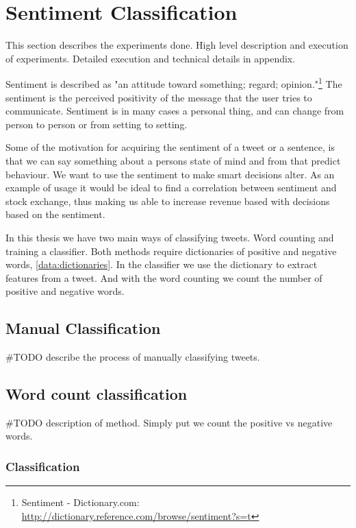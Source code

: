 
\chapter{Sentiment Classification}
This section describes the experiments done. High level description and
execution of experiments. Detailed execution and technical details in appendix. 

Sentiment is described as "an attitude toward something; regard; opinion."\footnote{Sentiment - Dictionary.com: \url{http://dictionary.reference.com/browse/sentiment?s=t}}
The sentiment is the perceived positivity of the message that the user tries to
communicate. Sentiment is in many cases a personal thing, and can change from
person to person or from setting to setting.  

Some of the motivation for acquiring the sentiment of a tweet or a sentence, is
that we can say something about a persons state of mind and from that predict
behaviour. We want to use the sentiment to make smart decisions alter. As an
example of usage it would be ideal to find a correlation between sentiment and
stock exchange, thus making us able to increase revenue based with decisions
based on the sentiment. 

In this thesis we have two main ways of classifying tweets. Word counting and
training a classifier. Both methods require dictionaries of positive and
negative words, \ref{data:dictionaries}. In the classifier we use the dictionary
to extract features from a tweet. And with the word counting we count the
number of positive and negative words. 

\section{Manual Classification}\label{sentiment:manual_classification}
#TODO describe the process of manually classifying tweets. 

\section{Word count classification}
#TODO description of method. 
Simply put we count the positive vs negative words. 

\subsection{Classification}

